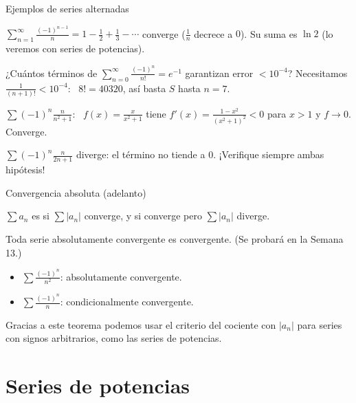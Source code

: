 \documentclass[10pt,aspectratio=169]{beamer}
\begin{document}
\begin{frame}{Ejemplos de series alternadas}
  \begin{ejemplo}
    $\displaystyle\sum_{n=1}^\infty\frac{(-1)^{n-1}}{n}=1-\frac12+\frac13-\cdots$ converge ($\frac1n$ decrece a $0$). Su suma es $\ln2$ (lo veremos con series de potencias).
  \end{ejemplo}
  \begin{ejemplo}[2: estimación]
    ¿Cuántos términos de $\displaystyle\sum_{n=0}^\infty\frac{(-1)^n}{n!}=e^{-1}$ garantizan error $<10^{-4}$?
    \quad Necesitamos $\frac{1}{(n+1)!}<10^{-4}$: \ $8!=40320$, así basta $S$ hasta $n=7$.
  \end{ejemplo}
  \begin{ejemplo}[3]
    $\displaystyle\sum(-1)^n\frac{n}{n^2+1}$: \ $f(x)=\frac{x}{x^2+1}$ tiene $f'(x)=\frac{1-x^2}{(x^2+1)^2}<0$ para $x>1$ y $f\to0$. Converge.
  \end{ejemplo}
  \begin{observacion}
    $\sum(-1)^n\frac{n}{2n+1}$ \alert{diverge}: el término no tiende a $0$. ¡Verifique siempre ambas hipótesis!
  \end{observacion}
\end{frame}

\begin{frame}{Convergencia absoluta (adelanto)}
  \begin{definicion}
    $\sum a_n$ es  si $\sum|a_n|$ converge, y  si
    converge pero $\sum|a_n|$ diverge.
  \end{definicion}
  \begin{teorema}
    Toda serie absolutamente convergente es convergente. \quad (Se probará en la Semana 13.)
  \end{teorema}
  \begin{ejemplo}
    \begin{itemize}
      \item $\sum\frac{(-1)^n}{n^2}$: absolutamente convergente.
      \item $\sum\frac{(-1)^n}{n}$: condicionalmente convergente.
    \end{itemize}
  \end{ejemplo}
  \small Gracias a este teorema podemos usar el criterio del cociente con $|a_n|$ para series con signos arbitrarios, como las
  series de potencias.
\end{frame}

\section{Series de potencias}
\end{document}
